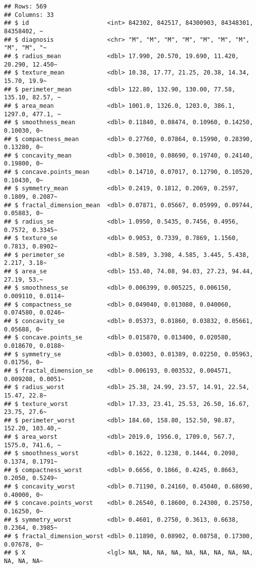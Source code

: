 \documentclass[
]{article}
\begin{document}
\begin{verbatim}
## Rows: 569
## Columns: 33
## $ id                      <int> 842302, 842517, 84300903, 84348301, 84358402, ~
## $ diagnosis               <chr> "M", "M", "M", "M", "M", "M", "M", "M", "M", "~
## $ radius_mean             <dbl> 17.990, 20.570, 19.690, 11.420, 20.290, 12.450~
## $ texture_mean            <dbl> 10.38, 17.77, 21.25, 20.38, 14.34, 15.70, 19.9~
## $ perimeter_mean          <dbl> 122.80, 132.90, 130.00, 77.58, 135.10, 82.57, ~
## $ area_mean               <dbl> 1001.0, 1326.0, 1203.0, 386.1, 1297.0, 477.1, ~
## $ smoothness_mean         <dbl> 0.11840, 0.08474, 0.10960, 0.14250, 0.10030, 0~
## $ compactness_mean        <dbl> 0.27760, 0.07864, 0.15990, 0.28390, 0.13280, 0~
## $ concavity_mean          <dbl> 0.30010, 0.08690, 0.19740, 0.24140, 0.19800, 0~
## $ concave.points_mean     <dbl> 0.14710, 0.07017, 0.12790, 0.10520, 0.10430, 0~
## $ symmetry_mean           <dbl> 0.2419, 0.1812, 0.2069, 0.2597, 0.1809, 0.2087~
## $ fractal_dimension_mean  <dbl> 0.07871, 0.05667, 0.05999, 0.09744, 0.05883, 0~
## $ radius_se               <dbl> 1.0950, 0.5435, 0.7456, 0.4956, 0.7572, 0.3345~
## $ texture_se              <dbl> 0.9053, 0.7339, 0.7869, 1.1560, 0.7813, 0.8902~
## $ perimeter_se            <dbl> 8.589, 3.398, 4.585, 3.445, 5.438, 2.217, 3.18~
## $ area_se                 <dbl> 153.40, 74.08, 94.03, 27.23, 94.44, 27.19, 53.~
## $ smoothness_se           <dbl> 0.006399, 0.005225, 0.006150, 0.009110, 0.0114~
## $ compactness_se          <dbl> 0.049040, 0.013080, 0.040060, 0.074580, 0.0246~
## $ concavity_se            <dbl> 0.05373, 0.01860, 0.03832, 0.05661, 0.05688, 0~
## $ concave.points_se       <dbl> 0.015870, 0.013400, 0.020580, 0.018670, 0.0188~
## $ symmetry_se             <dbl> 0.03003, 0.01389, 0.02250, 0.05963, 0.01756, 0~
## $ fractal_dimension_se    <dbl> 0.006193, 0.003532, 0.004571, 0.009208, 0.0051~
## $ radius_worst            <dbl> 25.38, 24.99, 23.57, 14.91, 22.54, 15.47, 22.8~
## $ texture_worst           <dbl> 17.33, 23.41, 25.53, 26.50, 16.67, 23.75, 27.6~
## $ perimeter_worst         <dbl> 184.60, 158.80, 152.50, 98.87, 152.20, 103.40,~
## $ area_worst              <dbl> 2019.0, 1956.0, 1709.0, 567.7, 1575.0, 741.6, ~
## $ smoothness_worst        <dbl> 0.1622, 0.1238, 0.1444, 0.2098, 0.1374, 0.1791~
## $ compactness_worst       <dbl> 0.6656, 0.1866, 0.4245, 0.8663, 0.2050, 0.5249~
## $ concavity_worst         <dbl> 0.71190, 0.24160, 0.45040, 0.68690, 0.40000, 0~
## $ concave.points_worst    <dbl> 0.26540, 0.18600, 0.24300, 0.25750, 0.16250, 0~
## $ symmetry_worst          <dbl> 0.4601, 0.2750, 0.3613, 0.6638, 0.2364, 0.3985~
## $ fractal_dimension_worst <dbl> 0.11890, 0.08902, 0.08758, 0.17300, 0.07678, 0~
## $ X                       <lgl> NA, NA, NA, NA, NA, NA, NA, NA, NA, NA, NA, NA~
\end{verbatim}
\end{document}
